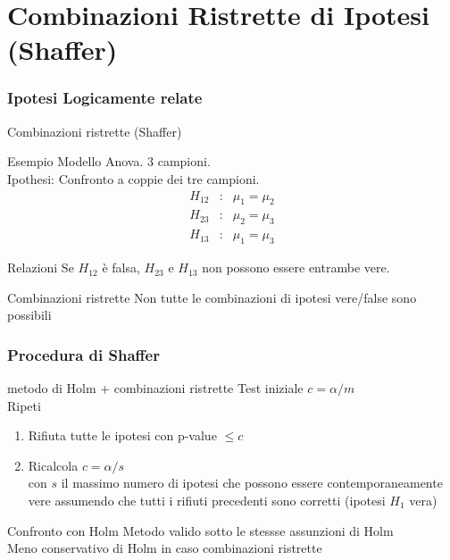 \documentclass[xcolor={pdftex,dvipsnames,table}]{beamer}
\newcommand{\bb}[1]{\begin{block}{#1}}
\newcommand{\eb}{\end{block}}
\newcommand{\be}{\begin {enumerate}}
\newcommand{\ee}{\end{enumerate}}
\newcommand{\bfr}[1]{\begin{frame} \frametitle{#1}}
\begin{document}
\begin{frame}
\begin{center}
\end{center}
\end{frame}

\section{Combinazioni Ristrette di Ipotesi (Shaffer)}
\bfr{Ipotesi Logicamente relate}
{Combinazioni ristrette (Shaffer)}
 \bb{Esempio}
   Modello Anova. 3 campioni.\\
   Ipothesi: Confronto a coppie dei tre campioni.
   \begin{eqnarray*}
     H_{12}&:& \mu_1=\mu_2\\
     H_{23}&:& \mu_2=\mu_3\\
     H_{13}&:& \mu_1=\mu_3
   \end{eqnarray*}
 \eb
 \bb{Relazioni}
   Se $H_{12}$ \`e falsa, $H_{23}$ e $H_{13}$ non possono essere entrambe vere.
 \eb
 \bb{Combinazioni ristrette}
   Non tutte le combinazioni di ipotesi vere/false sono possibili
 \eb
\end{frame}


\bfr{Procedura di Shaffer}
 \bb{metodo di Holm + combinazioni ristrette}
   Test iniziale $c = \alpha/m$
   \\ Ripeti
   \be
     \item Rifiuta tutte le ipotesi con p-value $\leq c$
     \item Ricalcola $c = \alpha/s$ \\ con $s$ il massimo numero di ipotesi che possono essere contemporaneamente vere assumendo che tutti i rifiuti precedenti sono corretti (ipotesi $H_1$ vera)
   \ee
 \eb
 \bb{Confronto con Holm}
   Metodo valido sotto le stessse assunzioni di Holm
   \\ Meno conservativo di Holm in caso combinazioni ristrette
 \eb
\end{frame}
\end{document}
